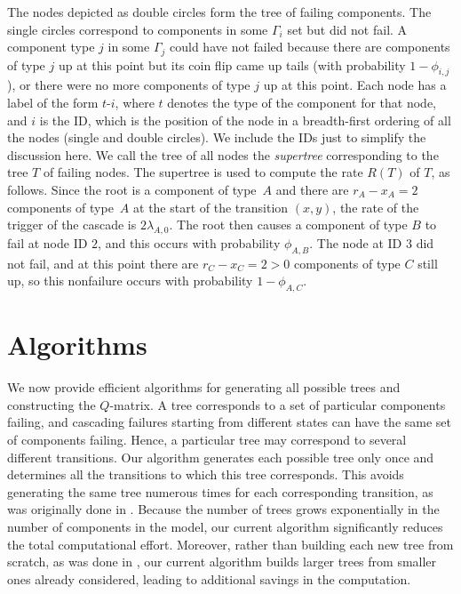 \documentclass[12pt]{article}
\begin{document}
The nodes depicted as double circles
form the tree of failing components.
The single circles correspond to
components in some $\Gamma_i$ set
but did not fail.  A component type
$j$ in some $\Gamma_j$ could have
not failed because there are
components of type $j$ up at this
point but its coin flip
came up tails 
(with probability $1 - \phi_{i,j}$),
or there were no more components of
type $j$ up at this point.
Each node has a label of the form
$t$-$i$, where $t$ denotes the
type of the component for that node,
and $i$ is the ID, which
is the position of the node
in a breadth-first ordering of
all the nodes (single and double circles).
We include the IDs just to simplify
the discussion here.
We call the tree of all nodes
the \textit{supertree} corresponding
to the tree $T$ of failing nodes.
The supertree is used to compute
the rate $R(T)$ of $T$, as follows.
Since the root is a component of
type~$A$ and there are
$r_A - x_A = 2$ components of type~$A$
at the start of the transition $(x,y)$,
the rate of the trigger of the cascade
is $2 \lambda_{A,0}$.
The root then causes a component
of type $B$ to fail at node ID $2$,
and this occurs with probability
$\phi_{A,B}$.
The node at ID $3$ did not fail,
and at this point there are
$r_C - x_C = 2 > 0$ components of type $C$
still up, so this nonfailure occurs
with probability $1 - \phi_{A,C}$.

\section{Algorithms}
\label{sec:alg}

We now provide efficient algorithms for generating all possible trees and constructing the $Q$-matrix. A tree corresponds to a set of particular components failing, and cascading failures starting from different states can have the same set of components failing. Hence, a particular tree may correspond to several different transitions. Our algorithm generates each possible tree only once and determines all the transitions to which this tree corresponds.  This avoids generating the same tree numerous times for each corresponding transition, as was originally done in \cite{ING:2009}.  Because the number of trees grows exponentially in the number of components in the model, our current algorithm significantly reduces the total computational effort. Moreover, rather than building each new tree from scratch, as was done in \cite{ING:2009}, our current algorithm builds larger trees from smaller ones already considered, leading to additional savings in the computation.
\end{document}
